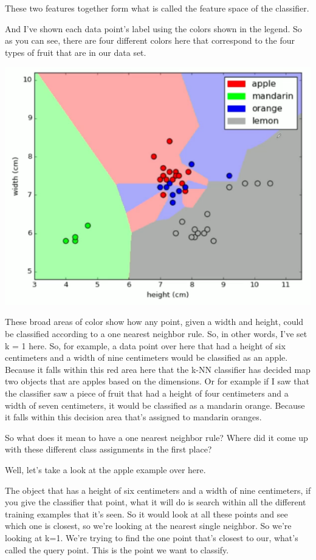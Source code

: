 \begin{multicols}{2}
These two features together form what is called the feature space of the classifier. 

And I've shown each data point's label using the colors shown in the legend. So as you can see, there are four different colors here that correspond to the four types of fruit that are in our data set. 

\begin{center}
\includegraphics[width=\linewidth]{img/kNN-Classifier-k1-example.png}
\end{center}

These broad areas of color show how any point, given a width and height, could be classified according to a one nearest neighbor rule. So, in other words, I've set k = 1 here. So, for example, a data point over here that had a height of six centimeters and a width of nine centimeters would be classified as an apple. Because it falls within this red area here that the k-NN classifier has decided map two objects that are apples based on the dimensions. Or for example if I saw that the classifier saw a piece of fruit that had a height of four centimeters and a width of seven centimeters, it would be classified as a mandarin orange. Because it falls within this decision area that's assigned to mandarin oranges. 

So what does it mean to have a one nearest neighbor rule? Where did it come up with these different class assignments in the first place? 

Well, let's take a look at the apple example over here. 

The object that has a height of six centimeters and a width of nine centimeters, if you give the classifier that point, what it will do is search within all the different training examples that it's seen. So it would look at all these points and see which one is closest, so we're looking at the nearest single neighbor. So we're looking at k=1. We're trying to find the one point that's closest to our, what's called the query point. This is the point we want to classify. 


\end{multicols}
